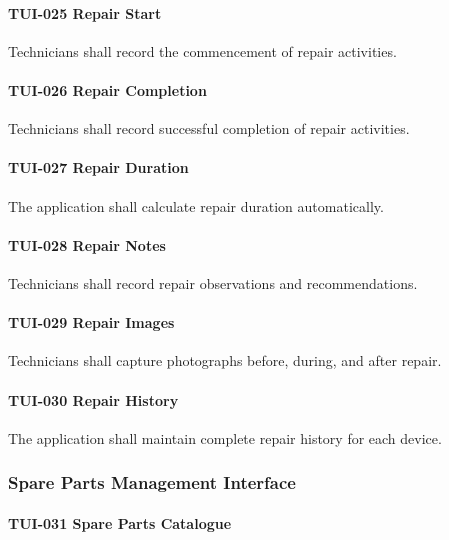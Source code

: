 \paragraph{TUI-025 Repair Start}

Technicians shall record the commencement of repair activities.

\paragraph{TUI-026 Repair Completion}

Technicians shall record successful completion of repair activities.

\paragraph{TUI-027 Repair Duration}

The application shall calculate repair duration automatically.

\paragraph{TUI-028 Repair Notes}

Technicians shall record repair observations and recommendations.

\paragraph{TUI-029 Repair Images}

Technicians shall capture photographs before, during, and after repair.

\paragraph{TUI-030 Repair History}

The application shall maintain complete repair history for each device.


\subsubsection*{Spare Parts Management Interface}

\paragraph{TUI-031 Spare Parts Catalogue}


